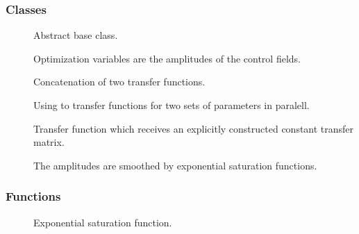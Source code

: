 \documentclass[letterpaper,10pt,english]{sphinxmanual}
\begin{document}
\subsubsection{Classes}
\label{\detokenize{qsim:id43}}\begin{description}
\item[{{\hyperref[\detokenize{qsim:qsim.transfer_function.TransferFunction}]{}}}] \leavevmode
Abstract base class.

\item[{{\hyperref[\detokenize{qsim:qsim.transfer_function.IdentityTF}]{}}}] \leavevmode
Optimization variables are the amplitudes of the control fields.

\item[{{\hyperref[\detokenize{qsim:qsim.transfer_function.ConcatenateTF}]{}}}] \leavevmode
Concatenation of two transfer functions.

\item[{{\hyperref[\detokenize{qsim:qsim.transfer_function.ParallelTF}]{}}}] \leavevmode
Using to transfer functions for two sets of parameters in paralell.

\item[{{\hyperref[\detokenize{qsim:qsim.transfer_function.CustomTF}]{}}}] \leavevmode
Transfer function which receives an explicitly constructed constant
transfer matrix.

\item[{{\hyperref[\detokenize{qsim:qsim.transfer_function.ExponentialTF}]{}}}] \leavevmode
The amplitudes are smoothed by exponential saturation functions.

\end{description}


\subsubsection{Functions}
\label{\detokenize{qsim:id44}}\begin{description}
\item[{{\hyperref[\detokenize{qsim:qsim.transfer_function.exp_saturation}]{}}}] \leavevmode
Exponential saturation function.

\end{description}
\end{document}
